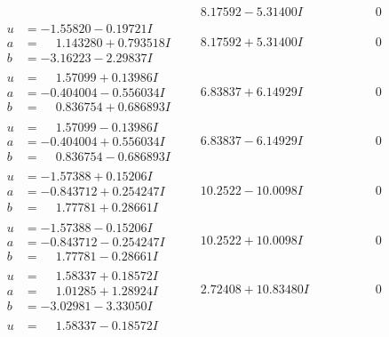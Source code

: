 \documentclass[1p]{elsarticle_modified}
\theoremstyle{definition}
\begin{document}
$$\begin{array}{c|c|c}
 & \phantom{-}8.17592 - 5.31400 I & \phantom{-0.000000 } 0 \\ \hline\begin{aligned}
u &= -1.55820 - 0.19721 I \\
a &= \phantom{-}1.143280 + 0.793518 I \\
b &= -3.16223 - 2.29837 I\end{aligned}
 & \phantom{-}8.17592 + 5.31400 I & \phantom{-0.000000 } 0 \\ \hline\begin{aligned}
u &= \phantom{-}1.57099 + 0.13986 I \\
a &= -0.404004 - 0.556034 I \\
b &= \phantom{-}0.836754 + 0.686893 I\end{aligned}
 & \phantom{-}6.83837 + 6.14929 I & \phantom{-0.000000 } 0 \\ \hline\begin{aligned}
u &= \phantom{-}1.57099 - 0.13986 I \\
a &= -0.404004 + 0.556034 I \\
b &= \phantom{-}0.836754 - 0.686893 I\end{aligned}
 & \phantom{-}6.83837 - 6.14929 I & \phantom{-0.000000 } 0 \\ \hline\begin{aligned}
u &= -1.57388 + 0.15206 I \\
a &= -0.843712 + 0.254247 I \\
b &= \phantom{-}1.77781 + 0.28661 I\end{aligned}
 & \phantom{-}10.2522 - 10.0098 I & \phantom{-0.000000 } 0 \\ \hline\begin{aligned}
u &= -1.57388 - 0.15206 I \\
a &= -0.843712 - 0.254247 I \\
b &= \phantom{-}1.77781 - 0.28661 I\end{aligned}
 & \phantom{-}10.2522 + 10.0098 I & \phantom{-0.000000 } 0 \\ \hline\begin{aligned}
u &= \phantom{-}1.58337 + 0.18572 I \\
a &= \phantom{-}1.01285 + 1.28924 I \\
b &= -3.02981 - 3.33050 I\end{aligned}
 & \phantom{-}2.72408 + 10.83480 I & \phantom{-0.000000 } 0 \\ \hline\begin{aligned}
u &= \phantom{-}1.58337 - 0.18572 I \\

\end{aligned}
\end{array}$$
\end{document}
